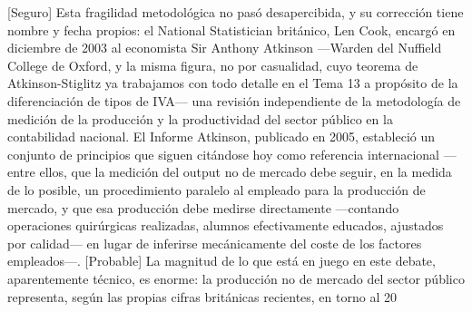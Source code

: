 \documentclass[10pt,a4paper]{article}
\begin{document}
[Seguro] Esta fragilidad metodológica no pasó desapercibida, y su corrección tiene nombre y fecha propios: el National Statistician británico, Len Cook, encargó en diciembre de 2003 al economista Sir Anthony Atkinson —Warden del Nuffield College de Oxford, y la misma figura, no por casualidad, cuyo teorema de Atkinson-Stiglitz ya trabajamos con todo detalle en el Tema 13 a propósito de la diferenciación de tipos de IVA— una revisión independiente de la metodología de medición de la producción y la productividad del sector público en la contabilidad nacional. El Informe Atkinson, publicado en 2005, estableció un conjunto de principios que siguen citándose hoy como referencia internacional —entre ellos, que la medición del output no de mercado debe seguir, en la medida de lo posible, un procedimiento paralelo al empleado para la producción de mercado, y que esa producción debe medirse directamente —contando operaciones quirúrgicas realizadas, alumnos efectivamente educados, ajustados por calidad— en lugar de inferirse mecánicamente del coste de los factores empleados—. [Probable] La magnitud de lo que está en juego en este debate, aparentemente técnico, es enorme: la producción no de mercado del sector público representa, según las propias cifras británicas recientes, en torno al 20%
\end{document}
